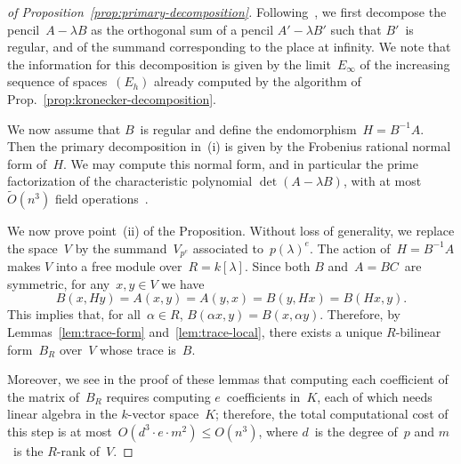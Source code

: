 \documentclass{lms}
\def\Ot{\widetilde{O}}
\begin{document}
\begin{proof}[of Proposition~\ref{prop:primary-decomposition}]
Following~\cite[Lemma 4.1]{inventiones1976waterhouse},
we first decompose the pencil~$A - λ B$ as the orthogonal sum of
a pencil $A' - λ B'$ such that $B'$~is regular,
and of the summand corresponding to the place at infinity.
We note that the information for this decomposition is given
by the limit~$E_{∞}$ of the increasing sequence of spaces~$(E_{h})$
already computed by the algorithm of Prop.~\ref{prop:kronecker-decomposition}.

We now assume that $B$~is regular and define the endomorphism~$H = B^{-1} A$.
Then the primary decomposition in~(i) is given by
the Frobenius rational normal form of~$H$.
We may compute this normal form, and in particular
the prime factorization of the characteristic polynomial $\det (A - λ B)$,
with at most~$\Ot(n^3)$ field operations~\cite{kaltoffen11compute}.

\medbreak

We now prove point~(ii) of the Proposition.
Without loss of generality, we replace the space~$V$
by the summand~$V_{p^e}$ associated to~$p(λ)^e$.
The action of~$H = B^{-1} A$ makes $V$ into a free module over~$R = k[λ]$.
Since both $B$ and~$A=BC$~are symmetric, for any~$x, y ∈ V$ we have
\begin{equation}
B(x, H y) = A(x, y) = A(y, x) = B(y, H x) = B(H x, y).
\end{equation}
This implies that, for all~$α ∈ R$, $B(α x, y) = B(x, α y)$.
Therefore, by Lemmas~\ref{lem:trace-form} and~\ref{lem:trace-local},
there exists a unique $R$-bilinear form~$B_R$ over~$V$ whose trace is~$B$.

Moreover, we see in the proof of these lemmas
that computing each coefficient of the matrix of~$B_R$
requires computing $e$~coefficients in~$K$,
each of which needs linear algebra in the $k$-vector space~$K$;
therefore, the total computational cost of this step
is at most~$O(d^3 · e · m^2) ≤ O(n^3)$,
where $d$~is the degree of~$p$ and $m$~is the $R$-rank of~$V$.

\medbreak


\end{proof}
\end{document}

